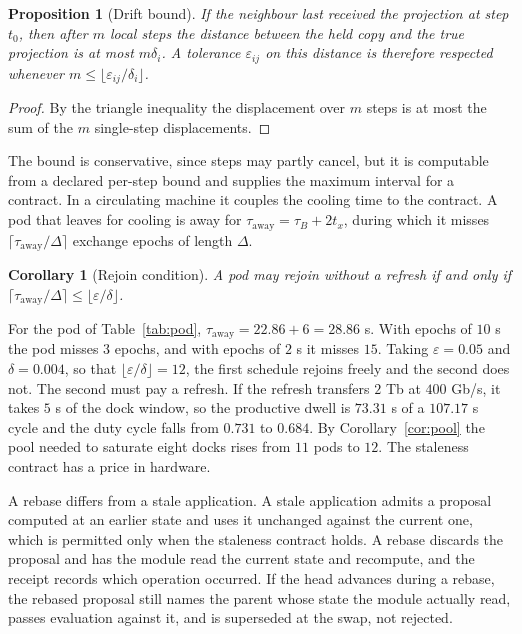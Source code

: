 \documentclass[11pt,openany]{book}
\theoremstyle{plain}
\newtheorem{proposition}[theorem]{Proposition}
\newtheorem{corollary}[theorem]{Corollary}
\theoremstyle{definition}
\theoremstyle{remark}
\begin{document}
\begin{proposition}[Drift bound]
\label{prop:drift}
If the neighbour last received the projection at step $t_0$, then after $m$ local steps the distance between the held copy and the true projection is at most $m\delta_i$. A tolerance $\varepsilon_{ij}$ on this distance is therefore respected whenever $m\le\lfloor\varepsilon_{ij}/\delta_i\rfloor$.
\end{proposition}
\begin{proof}
By the triangle inequality the displacement over $m$ steps is at most the sum of the $m$ single-step displacements.
\end{proof}

The bound is conservative, since steps may partly cancel, but it is computable from a declared per-step bound and supplies the maximum interval for a contract. In a circulating machine it couples the cooling time to the contract. A pod that leaves for cooling is away for $\tau_{\mathrm{away}}=\tau_B+2t_x$, during which it misses $\lceil\tau_{\mathrm{away}}/\Delta\rceil$ exchange epochs of length $\Delta$.

\begin{corollary}[Rejoin condition]
\label{cor:rejoin}
A pod may rejoin without a refresh if and only if $\lceil\tau_{\mathrm{away}}/\Delta\rceil\le\lfloor\varepsilon/\delta\rfloor$.
\end{corollary}

For the pod of Table~\ref{tab:pod}, $\tau_{\mathrm{away}}=22.86+6=28.86$ s. With epochs of $10$ s the pod misses $3$ epochs, and with epochs of $2$ s it misses $15$. Taking $\varepsilon=0.05$ and $\delta=0.004$, so that $\lfloor\varepsilon/\delta\rfloor=12$, the first schedule rejoins freely and the second does not. The second must pay a refresh. If the refresh transfers $2$ Tb at $400$ Gb/s, it takes $5$ s of the dock window, so the productive dwell is $73.31$ s of a $107.17$ s cycle and the duty cycle falls from $0.731$ to $0.684$. By Corollary~\ref{cor:pool} the pool needed to saturate eight docks rises from $11$ pods to $12$. The staleness contract has a price in hardware.

A rebase differs from a stale application. A stale application admits a proposal computed at an earlier state and uses it unchanged against the current one, which is permitted only when the staleness contract holds. A rebase discards the proposal and has the module read the current state and recompute, and the receipt records which operation occurred. If the head advances during a rebase, the rebased proposal still names the parent whose state the module actually read, passes evaluation against it, and is superseded at the swap, not rejected.
\end{document}
